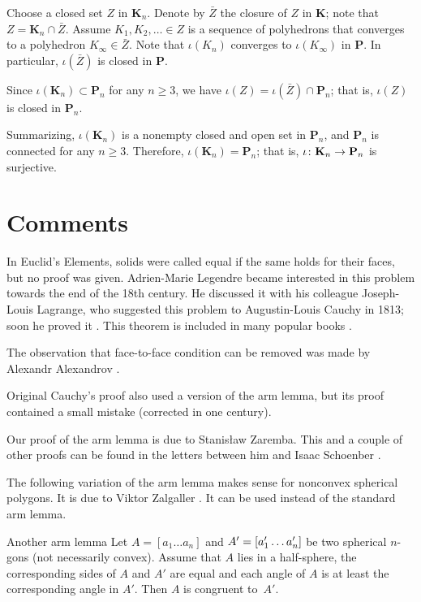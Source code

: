 Choose a closed set $Z$ in $\mathbf{K}_n$.
Denote by $\bar Z$ the closure of $Z$ in $\mathbf{K}$; note that $Z=\mathbf{K}_n\cap \bar Z$.
Assume $K_1,K_2,\dots\in Z$ is a sequence of polyhedrons that converges to a polyhedron $K_\infty\in\bar Z$.
Note that $\iota(K_n)$ converges to $\iota(K_\infty)$ in $\mathbf{P}$.
In particular, $\iota(\bar Z)$ is closed in $\mathbf{P}$.

Since $\iota(\mathbf{K}_n)\subset \mathbf{P}_n$ for any $n\ge 3$, we have $\iota (Z)=\iota(\bar Z)\cap \mathbf{P}_n$;
that is, $\iota (Z)$ is closed in $\mathbf{P}_n$. 

\medskip

Summarizing, $\iota(\mathbf{K}_n)$ is a nonempty closed and open set in $\mathbf{P}_n$, and $\mathbf{P}_n$ is connected for any $n\ge 3$.
Therefore, $\iota(\mathbf{K}_n)=\mathbf{P}_n$; that is, $\iota\:\mathbf{K}_n\z\to\mathbf{P}_n$ is surjective.
\qeds

\section{Comments}

In Euclid's Elements, 
solids were called equal if the same holds for their faces, but no proof was given.
Adrien-Marie Legendre became interested in this problem towards the end of the 18th century.
He discussed it with his colleague Joseph-Louis Lagrange, who suggested this problem to Augustin-Louis Cauchy in 1813; soon he proved it \cite{cauchy}.
This theorem is included in many popular books \cite{aigner-zigler,dolbilin,tabacnikov-fuks}.

The observation that face-to-face condition can be removed was made by 
Alexandr Alexandrov \cite{alexandrov-1941}.

Original Cauchy's proof \cite{cauchy}
also used a version of the arm lemma, but its proof contained a small mistake (corrected in one century).

Our proof of the arm lemma is due to Stanisław Zaremba.
This and a couple of other proofs can be found in the letters between him and Isaac Schoenber \cite{schoenberg-zaremba}.

The following variation of the arm lemma makes sense for nonconvex spherical polygons.
It is due to Viktor Zalgaller \cite{zalgaller}.
It can be used instead of the standard arm lemma.

\begin{thm}{Another arm lemma}
Let $A=[a_1\dots a_n]$ and $A'\z=[a'_1\z\dots a'_n]$ be two spherical $n$-gons (not necessarily convex).
Assume that $A$ lies in a half-sphere,
the corresponding sides of $A$ and $A'$ are equal
and each angle of $A$ is at least the corresponding angle in $A'$.
Then $A$ is congruent to~$A'$. 
\end{thm}

